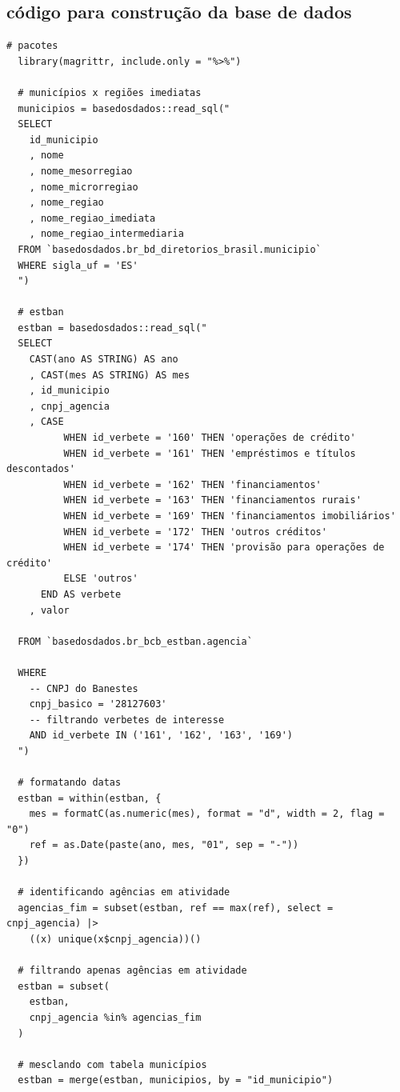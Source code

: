 \begin{anexosenv}
\partanexos

\chapter{código para construção da base de dados} \label{anexo_a}

\begin{lstlisting}[frame=single]
  # pacotes
  library(magrittr, include.only = "%>%")
  
  # municípios x regiões imediatas
  municipios = basedosdados::read_sql("
  SELECT
    id_municipio
    , nome
    , nome_mesorregiao
    , nome_microrregiao
    , nome_regiao
    , nome_regiao_imediata
    , nome_regiao_intermediaria
  FROM `basedosdados.br_bd_diretorios_brasil.municipio`
  WHERE sigla_uf = 'ES'
  ")
  
  # estban
  estban = basedosdados::read_sql("
  SELECT
    CAST(ano AS STRING) AS ano
    , CAST(mes AS STRING) AS mes
    , id_municipio
    , cnpj_agencia
    , CASE
          WHEN id_verbete = '160' THEN 'operações de crédito'
          WHEN id_verbete = '161' THEN 'empréstimos e títulos descontados'
          WHEN id_verbete = '162' THEN 'financiamentos'
          WHEN id_verbete = '163' THEN 'financiamentos rurais'
          WHEN id_verbete = '169' THEN 'financiamentos imobiliários'
          WHEN id_verbete = '172' THEN 'outros créditos'
          WHEN id_verbete = '174' THEN 'provisão para operações de crédito'
          ELSE 'outros'
      END AS verbete
    , valor
  
  FROM `basedosdados.br_bcb_estban.agencia`
  
  WHERE
    -- CNPJ do Banestes
    cnpj_basico = '28127603'
    -- filtrando verbetes de interesse
    AND id_verbete IN ('161', '162', '163', '169')
  ")
  
  # formatando datas
  estban = within(estban, {
    mes = formatC(as.numeric(mes), format = "d", width = 2, flag = "0")
    ref = as.Date(paste(ano, mes, "01", sep = "-"))
  })
  
  # identificando agências em atividade
  agencias_fim = subset(estban, ref == max(ref), select = cnpj_agencia) |>
    ((x) unique(x$cnpj_agencia))()
  
  # filtrando apenas agências em atividade
  estban = subset(
    estban,
    cnpj_agencia %in% agencias_fim
  )

  # mesclando com tabela municípios
  estban = merge(estban, municipios, by = "id_municipio")


\end{lstlisting}
\end{anexosenv}
